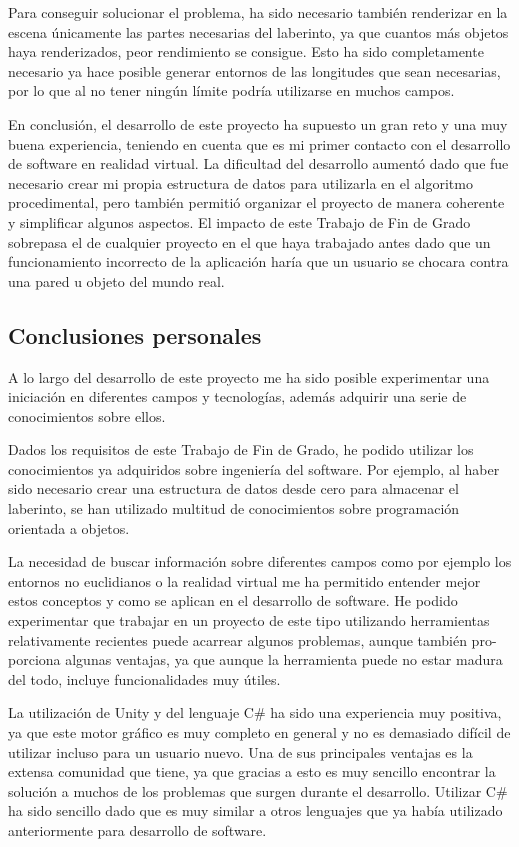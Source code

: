 \documentclass[../main.tex]{subfiles}
\begin{document}
Para conseguir solucionar el problema, ha sido necesario también renderizar en la escena únicamente las partes necesarias del laberinto, ya que cuantos más objetos haya renderizados, peor rendimiento se consigue. Esto ha sido completamente necesario ya hace posible generar entornos de las longitudes que sean necesarias, por lo que al no tener ningún límite podría utilizarse en muchos campos.

En conclusión, el desarrollo de este proyecto ha supuesto un gran reto y una muy buena experiencia, teniendo en cuenta que es mi primer contacto con el desarrollo de software en realidad virtual. La dificultad del desarrollo aumentó dado que fue necesario crear mi propia estructura de datos para utilizarla en el algoritmo procedimental, pero también permitió organizar el proyecto de manera coherente y simplificar algunos aspectos. El impacto de este Trabajo de Fin de Grado sobrepasa el de cualquier proyecto en el que haya trabajado antes dado que un funcionamiento incorrecto de la aplicación haría que un usuario se chocara contra una pared u objeto del mundo real.

\subsection{Conclusiones personales}

A lo largo del desarrollo de este proyecto me ha sido posible experimentar una iniciación en diferentes campos y tecnologías, además adquirir una serie de conocimientos sobre ellos.

Dados los requisitos de este Trabajo de Fin de Grado, he podido utilizar los conocimientos ya adquiridos sobre ingeniería del software. Por ejemplo, al haber sido necesario crear una estructura de datos desde cero para almacenar el laberinto, se han utilizado multitud de conocimientos sobre programación orientada a objetos.

La necesidad de buscar información sobre diferentes campos como por ejemplo los entornos no euclidianos o la realidad virtual me ha permitido entender mejor estos conceptos y como se aplican en el desarrollo de software. He podido experimentar que trabajar en un proyecto de este tipo utilizando herramientas relativamente recientes puede acarrear algunos problemas, aunque también pro- porciona algunas ventajas, ya que aunque la herramienta puede no estar madura del todo, incluye funcionalidades muy útiles.

La utilización de Unity y del lenguaje C\# ha sido una experiencia muy positiva, ya que este motor gráfico es muy completo en general y no es demasiado difícil de utilizar incluso para un usuario nuevo. Una de sus principales ventajas es la extensa comunidad que tiene, ya que gracias a esto es muy sencillo encontrar la solución a muchos de los problemas que surgen durante el desarrollo. Utilizar C\# ha sido sencillo dado que es muy similar a otros lenguajes que ya había utilizado anteriormente para desarrollo de software.
\end{document}
